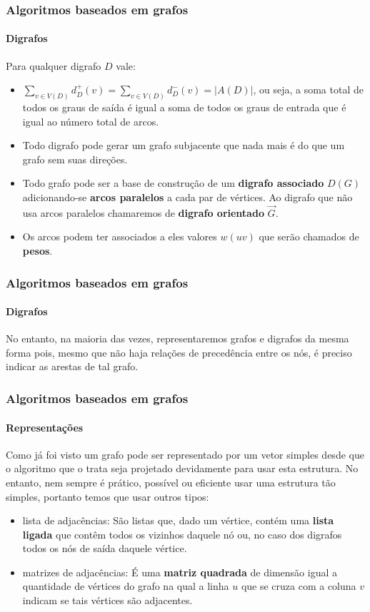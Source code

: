\begin{frame}
	\frametitle{Algoritmos baseados em grafos}
	\framesubtitle{Digrafos}
	\par Para qualquer digrafo $D$ vale:
	\begin{itemize}
		\item $ \sum_{v \in V(D)} d_D^+(v) = \sum_{v \in V(D)} d_D^-(v) = |A(D)| $, ou seja, a soma total de todos os graus de saída é igual a soma de todos os graus de entrada que é igual ao número total de arcos.
		\item Todo digrafo pode gerar um grafo subjacente que nada mais é do que um grafo sem suas direções.
		\item Todo grafo pode ser a base de construção de um \textbf{digrafo associado} $D(G)$ adicionando-se \textbf{arcos paralelos} a cada par de vértices. Ao digrafo que não usa arcos paralelos chamaremos de \textbf{digrafo orientado} $\overrightarrow{G}$.
		\item Os arcos podem ter associados a eles valores $w(uv)$ que serão chamados de \textbf{pesos}.
	\end{itemize}
\end{frame}

\begin{frame}
	\frametitle{Algoritmos baseados em grafos}
	\framesubtitle{Digrafos}
	\par No entanto, na maioria das vezes, representaremos grafos e digrafos da mesma forma pois, mesmo que não haja relações de precedência entre os nós, é preciso indicar as arestas de tal grafo. 
\end{frame}

\begin{frame}
	\frametitle{Algoritmos baseados em grafos}
	\framesubtitle{Representações}
	\par Como já foi visto um grafo pode ser representado por um vetor simples desde que o algoritmo que o trata seja projetado devidamente para usar esta estrutura. No entanto, nem sempre é prático, possível ou eficiente usar uma estrutura tão simples, portanto temos que usar outros tipos:
	\begin{itemize}
		\item lista de adjacências: São listas que, dado um vértice, contém uma \textbf{lista ligada} que contêm todos os vizinhos daquele nó ou, no caso dos digrafos todos os nós de saída daquele vértice.
		\item matrizes de adjacências: É uma \textbf{matriz quadrada} de dimensão igual a quantidade de vértices do grafo na qual a linha $u$ que se cruza com a coluna $v$ indicam se tais vértices são adjacentes.
	\end{itemize}
\end{frame}

